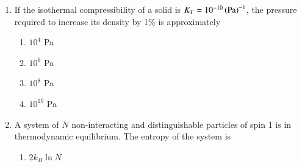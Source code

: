 \documentclass[journal]{IEEEtran}
\begin{document}
\begin{enumerate}
\begin{align*}
    V\brak{x}=
    \begin{cases}
    0 & \text{ if } 0 \le x \le a \\ \infty & \text{otherwise}
    \end{cases}
\end{align*}
are given by
\begin{align*}
    \psi_n\brak{x}=\sqrt{\frac{2}{a}}\sin\brak{\frac{n\pi x}{a}} , \quad \text{ where } n=1,2,3\dots
\end{align*}
The particle is subjected to a perturbation
\begin{align*}
V^\prime \brak{x}=
    \begin{cases}
    V_0\cos{\frac{\pi x}{a}} & \text{  for }0 \le x \le \frac{a}{2}
    \\ 0 & \text{\space otherwise}
    \end{cases}
\end{align*}
The shift in the ground state energy due to the perturbation, in the first order perturbation theory, is
\begin{multicols}{4}
    \begin{enumerate}
        \item $\frac{2V_0}{3\pi}$
        \item $\frac{V_0}{3\pi}$
        \item $-\frac{V_0}{3\pi}$
        \item $-\frac{2V_0}{3\pi}$
    \end{enumerate}
\end{multicols}
\item If the isothermal compressibility of a solid is $K_T = 10^{-10} \left(\text{Pa}\right)^{-1}$, the pressure required to increase its density by 1\% is approximately
\begin{multicols}{4}
    \begin{enumerate}
        \item $10^4$ Pa
        \item $10^6$ Pa
        \item $10^8$ Pa
        \item $10^{10}$ Pa
    \end{enumerate}
\end{multicols}
\item A system of $N$ non-interacting and distinguishable particles of spin 1 is in thermodynamic equilibrium. The entropy of the system is
\begin{multicols}{4}
    \begin{enumerate}
        \item $2k_B \ln N$

\end{enumerate}
\end{multicols}
\end{enumerate}
\end{document}
